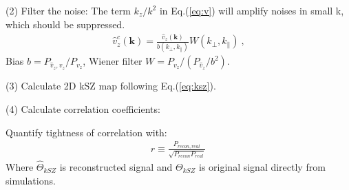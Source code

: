 (2) Filter the noise: 
The term $k_z/k^2$ in Eq.(\ref{eq:v}) will amplify noises in small k, 
which should be suppressed. 
\begin{eqnarray}
	\label{eq:wienerv}
\hat v_z^c(\bm{k})=\frac{\hat v_z(\bm{k})}{b(k_\perp,k_\parallel)}W(k_\perp,k_\parallel)\ ,
\end{eqnarray}
Bias $b=P_{\hat v_z,v_z}/P_{v_z}$, Wiener filter $W=P_{v_z}/(P_{\hat v_z}/b^2)$.

(3) Calculate 2D kSZ map following Eq.(\ref{eq:ksz}).

(4) Calculate correlation coefficients:

Quantify tightness of correlation with: 
\begin{eqnarray}
	r\equiv \frac{P_{recon,real}}{\sqrt{P_{recon}P_{real}}}\,
\end{eqnarray}
Where $\hat \Theta_{kSZ}$ is reconstructed signal 
and $\Theta_{kSZ}$ is original signal directly from simulations.


